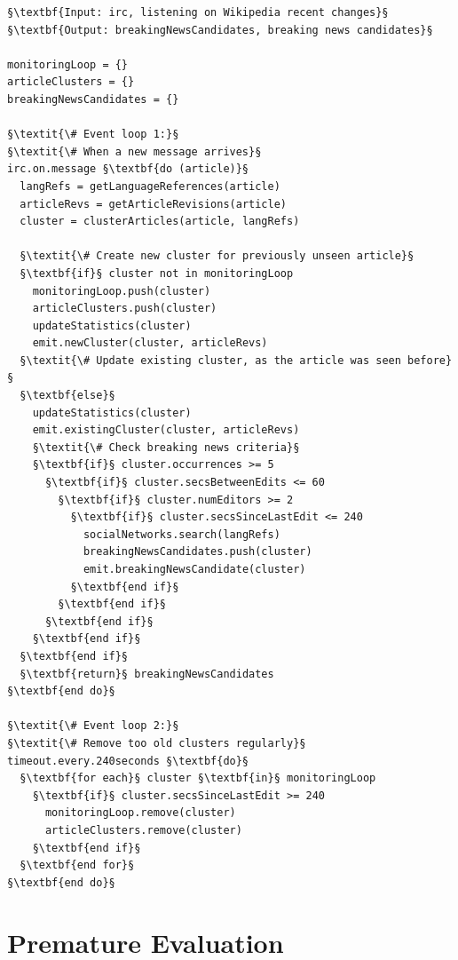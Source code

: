 \begin{lstlisting}[caption=The two main event loops
  of the application, 
  label=code:pseudocode-wikipedia-monitor, escapechar=§]
§\textbf{Input: irc, listening on Wikipedia recent changes}§ 
§\textbf{Output: breakingNewsCandidates, breaking news candidates}§ 

monitoringLoop = {}
articleClusters = {}
breakingNewsCandidates = {}
 
§\textit{\# Event loop 1:}§
§\textit{\# When a new message arrives}§
irc.on.message §\textbf{do (article)}§
  langRefs = getLanguageReferences(article)
  articleRevs = getArticleRevisions(article)
  cluster = clusterArticles(article, langRefs)  
  
  §\textit{\# Create new cluster for previously unseen article}§
  §\textbf{if}§ cluster not in monitoringLoop
    monitoringLoop.push(cluster)
    articleClusters.push(cluster)
    updateStatistics(cluster)
    emit.newCluster(cluster, articleRevs)    
  §\textit{\# Update existing cluster, as the article was seen before}§
  §\textbf{else}§
    updateStatistics(cluster)
    emit.existingCluster(cluster, articleRevs)
    §\textit{\# Check breaking news criteria}§
    §\textbf{if}§ cluster.occurrences >= 5
      §\textbf{if}§ cluster.secsBetweenEdits <= 60      
        §\textbf{if}§ cluster.numEditors >= 2
          §\textbf{if}§ cluster.secsSinceLastEdit <= 240
            socialNetworks.search(langRefs)
            breakingNewsCandidates.push(cluster)
            emit.breakingNewsCandidate(cluster)            
          §\textbf{end if}§          
        §\textbf{end if}§  
      §\textbf{end if}§        
    §\textbf{end if}§          
  §\textbf{end if}§
  §\textbf{return}§ breakingNewsCandidates
§\textbf{end do}§

§\textit{\# Event loop 2:}§
§\textit{\# Remove too old clusters regularly}§
timeout.every.240seconds §\textbf{do}§
  §\textbf{for each}§ cluster §\textbf{in}§ monitoringLoop
    §\textbf{if}§ cluster.secsSinceLastEdit >= 240
      monitoringLoop.remove(cluster)
      articleClusters.remove(cluster)
    §\textbf{end if}§
  §\textbf{end for}§ 
§\textbf{end do}§
\end{lstlisting}

\section{Premature Evaluation}
\label{sec:premature-evaluation}

